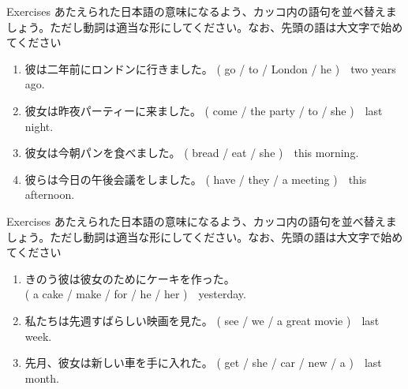 \documentclass[aspectratio=169,xcolor={dvipsnames,table}]{beamer}
\newcommand{\myaudio}[1]{\href{#1}{\faVolumeUp}}
\begin{document}
\begin{frame}[plain]{Exercises}
あたえられた日本語の意味になるよう、カッコ内の語句を並べ替えましょう。ただし動詞は適当な形にしてください。なお、先頭の語は大文字で始めてください


\begin{enumerate}
 \item 彼は二年前にロンドンに行きました。
(  go / to / London / he )~~two years ago.\\
 \item 彼女は昨夜パーティーに来ました。\hspace{1\zw}
( come / the  party / to / she )~~last night.\\
 \item 彼女は今朝パンを食べました。\hspace{2.65\zw}
( bread / eat /  she  )~~this morning.\\
 \item 彼らは今日の午後会議をしました。\hspace{.75\zw}
( have / they / a meeting )~~this afternoon.\\
\end{enumerate}
\hfill\myaudio{./audio/025_past_do_15.mp3}

\end{frame}


\begin{frame}[plain]{Exercises}
あたえられた日本語の意味になるよう、カッコ内の語句を並べ替えましょう。ただし動詞は適当な形にしてください。なお、先頭の語は大文字で始めてください


\begin{enumerate}
 \item きのう彼は彼女のためにケーキを作った。\\
\mbox{}\hfill{}( a cake / make / for / he / her )~~yesterday.\\
 \item 私たちは先週すばらしい映画を見た。
\hfill{}( see / we / a great movie )~~last week.\\
 \item 先月、彼女は新しい車を手に入れた。
( get / she / car  / new / a )~~last month.\\

\end{enumerate}
\hfill\myaudio{./audio/025_past_do_16.mp3}

\end{frame}
\end{document}
